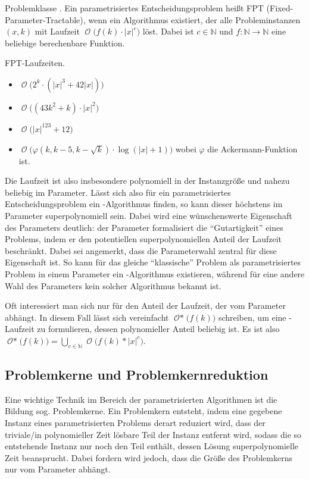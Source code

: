 \documentclass[a4paper,ngerman]{atseminar}
\newcommand{\N}{\ensuremath{\mathbb{N}}\xspace}
\newcommand{\BigO}[1]{\ensuremath{\operatorname{\mathcal{O}}\bigl(#1\bigr)}\xspace}
\newcommand{\BigOStar}[1]{\ensuremath{\operatorname{\mathcal{O*}}\bigl(#1\bigr)}\xspace}
\begin{document}
\begin{definition}{Problemklasse \FPT.}
  \label{OE:def:fpt}
  Ein parametrisiertes Entscheidungsproblem heißt FPT (Fixed-Parameter-Tractable), wenn ein Algorithmus existiert,
  der alle Probleminstanzen $(x, k)$ mit Laufzeit \BigO{f(k) \cdot |x|^c} löst.
  Dabei ist $c \in \N$ und $f: \N \rightarrow \N$ eine beliebige berechenbare Funktion.
\end{definition}

\begin{example}{FPT-Laufzeiten.}
  \begin{itemize}
    \item \BigO{2^k \cdot (|x|^3+42|x|)}
    \item \BigO{(43k^2+k) \cdot {|x|^2}}
    \item \BigO{|x|^{123}+12}
    \item \BigO{\varphi(k, k - 5, k - \sqrt{k}) \cdot \log(|x| + 1)} wobei $\varphi$ die Ackermann-Funktion ist.
  \end{itemize}
\end{example}

\noindent
Die Laufzeit ist also insbesondere polynomiell in der Instanzgröße und nahezu beliebig im Parameter.
Lässt sich also für ein parametrisiertes Entscheidungsproblem ein \FPT-Algorithmus finden, so kann dieser höchstens im Parameter superpolynomiell sein.
Dabei wird eine wünschenswerte Eigenschaft des Parameters deutlich: der Parameter formalisiert die \enquote{Gutartigkeit} eines Problems, indem er den potentiellen superpolynomiellen
Anteil der Laufzeit beschränkt. Dabei sei angemerkt, dass die Parameterwahl zentral für diese Eigenschaft ist.
So kann für das gleiche \enquote{klassische} Problem als parametrisiertes Problem in einem Parameter ein \FPT-Algorithmus existieren, während für eine andere Wahl
des Parameters kein solcher Algorithmus bekannt ist.

Oft interessiert man sich nur für den Anteil der Laufzeit, der vom Parameter abhängt. In diesem Fall lässt sich vereinfacht
$\BigOStar{f(k)}$ schreiben, um eine \FPT-Laufzeit zu formulieren, dessen polynomieller Anteil beliebig ist.
Es ist also $\BigOStar{f(k)} = \bigcup_{c \in \N} \BigO{f(k) * |x|^c}$.

\subsection{Problemkerne und Problemkernreduktion}
\label{OE:sec:kernel}

Eine wichtige Technik im Bereich der parametrisierten Algorithmen ist die Bildung sog. Problemkerne.
Ein Problemkern entsteht, indem eine gegebene Instanz eines parametrisierten Problems derart reduziert wird, dass der triviale/in polynomieller Zeit lösbare
Teil der Instanz entfernt wird, sodass die so entstehende Instanz nur noch den Teil enthält, dessen Lösung superpolynomielle Zeit beansprucht.
\noindent
Dabei fordern wird jedoch, dass die Größe des Problemkerns nur vom Parameter abhängt.
\end{document}
